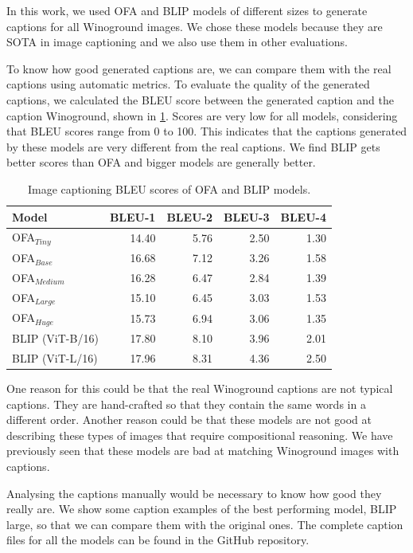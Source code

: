 In this work, we used OFA \cite{wang2022unifying} and BLIP \cite{li2022blip} models of different sizes to generate captions for all Winoground images. We chose these models because they are SOTA in image captioning and we also use them in other evaluations.

To know how good generated captions are, we can compare them with the real captions using automatic metrics. To evaluate the quality of the generated captions, we calculated the BLEU score \cite{papineni-etal-2002-bleu} between the generated caption and the caption Winoground, shown in \cref{tab:bleu_scores}. Scores are very low for all models, considering that BLEU scores range from 0 to 100. This indicates that the captions generated by these models are very different from the real captions. We find BLIP gets better scores than OFA and bigger models are generally better.

\begin{table}[ht]
    \centering
    \begin{tabular}{lrrrr}
    \toprule
    Model &  BLEU-1 &  BLEU-2 &  BLEU-3 &  BLEU-4 \\
    \midrule
    OFA$_{Tiny}$    &   14.40 &    5.76 &    2.50 &    1.30 \\
    OFA$_{Base}$    &   16.68 &    7.12 &    3.26 &    1.58 \\
    OFA$_{Medium}$  &   16.28 &    6.47 &    2.84 &    1.39 \\
    OFA$_{Large}$   &   15.10 &    6.45 &    3.03 &    1.53 \\
    OFA$_{Huge}$    &   15.73 &    6.94 &    3.06 &    1.35 \\
    BLIP (ViT-B/16) &   17.80 &    8.10 &    3.96 &    2.01 \\
    BLIP (ViT-L/16) &   17.96 &    8.31 &    4.36 &    2.50 \\
    \bottomrule
    \end{tabular}
    \caption{Image captioning BLEU scores of OFA and BLIP models.}
    \label{tab:bleu_scores}
\end{table}

One reason for this could be that the real Winoground captions are not typical captions. They are hand-crafted so that they contain the same words in a different order. Another reason could be that these models are not good at describing these types of images that require compositional reasoning. We have previously seen that these models are bad at matching Winoground images with captions.

Analysing the captions manually would be necessary to know how good they really are. We show some caption examples of the best performing model, BLIP large, so that we can compare them with the original ones. The complete caption files for all the models can be found in the GitHub repository.

